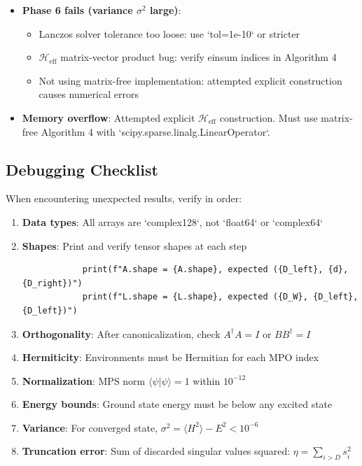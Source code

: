 \documentclass[aps,prb,onecolumn,scriptaddress]{revtex4-2}
\newcommand{\braket}[2]{\langle#1|#2\rangle}
\begin{document}
\begin{itemize}
\begin{itemize}
			\item Missing noise injection: add $\rho \to \rho + \alpha \mathbb{I}$ with $\alpha \sim 10^{-5}$
			\item Initial state too far from ground state: use random MPS with small $D$ first
		\end{itemize}
		\item \textbf{Phase 6 fails (variance $\sigma^2$ large)}: 
		\begin{itemize}
			\item Lanczos solver tolerance too loose: use `tol=1e-10` or stricter
			\item $\mathcal{H}_{\text{eff}}$ matrix-vector product bug: verify einsum indices in Algorithm 4
			\item Not using matrix-free implementation: attempted explicit construction causes numerical errors
		\end{itemize}
		\item \textbf{Memory overflow}: Attempted explicit $\mathcal{H}_{\text{eff}}$ construction. Must use matrix-free Algorithm 4 with `scipy.sparse.linalg.LinearOperator`.
	\end{itemize}
	
	\subsection{Debugging Checklist}
	
	When encountering unexpected results, verify in order:
	
	\begin{enumerate}
		\item \textbf{Data types}: All arrays are `complex128`, not `float64` or `complex64`
		\item \textbf{Shapes}: Print and verify tensor shapes at each step
		\begin{verbatim}
			print(f"A.shape = {A.shape}, expected ({D_left}, {d}, {D_right})")
			print(f"L.shape = {L.shape}, expected ({D_W}, {D_left}, {D_left})")
		\end{verbatim}
		\item \textbf{Orthogonality}: After canonicalization, check $A^\dagger A = I$ or $BB^\dagger = I$
		\item \textbf{Hermiticity}: Environments must be Hermitian for each MPO index
		\item \textbf{Normalization}: MPS norm $\braket{\psi}{\psi} = 1$ within $10^{-12}$
		\item \textbf{Energy bounds}: Ground state energy must be below any excited state
		\item \textbf{Variance}: For converged state, $\sigma^2 = \langle H^2 \rangle - E^2 < 10^{-6}$
		\item \textbf{Truncation error}: Sum of discarded singular values squared: $\eta = \sum_{i>D} s_i^2$
		\end{enumerate}
		
\end{document}
